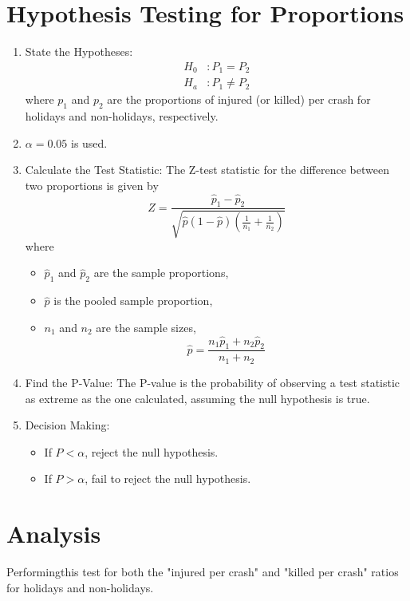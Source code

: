 \documentclass{article}
\begin{document}
\section{Hypothesis Testing for Proportions}

\begin{enumerate}
    \item State the Hypotheses:
    \begin{align*}
    H_0 &: P_1 = P_2 \\
    H_a &: P_1 \neq P_2
    \end{align*}
    where \(p_1\) and \(p_2\) are the proportions of injured (or killed) per crash for holidays and non-holidays, respectively.

    \item \(\alpha = 0.05\) is used.

    \item Calculate the Test Statistic:
    The Z-test statistic for the difference between two proportions is given by
    \[
    Z = \frac{{\hat{p}_1 - \hat{p}_2}}{{\sqrt{\hat{p}(1 - \hat{p})\left(\frac{1}{n_1} + \frac{1}{n_2}\right)}}}
    \]
    where
    \begin{itemize}
        \item \(\hat{p}_1\) and \(\hat{p}_2\) are the sample proportions,
        \item \(\hat{p}\) is the pooled sample proportion,
        \item \(n_1\) and \(n_2\) are the sample sizes,
        \[
        \hat{p} = \frac{{n_1 \hat{p}_1 + n_2 \hat{p}_2}}{{n_1 + n_2}}
        \]
    \end{itemize}

    \item Find the P-Value:
    The P-value is the probability of observing a test statistic as extreme as the one calculated, assuming the null hypothesis is true.

    \item Decision Making:
    \begin{itemize}
        \item If \(P < \alpha\), reject the null hypothesis.
        \item If \(P > \alpha\), fail to reject the null hypothesis.
    \end{itemize}
\end{enumerate}

\section{Analysis}
Performingthis test for both the "injured per crash" and "killed per crash" ratios for holidays and non-holidays.
\end{document}
